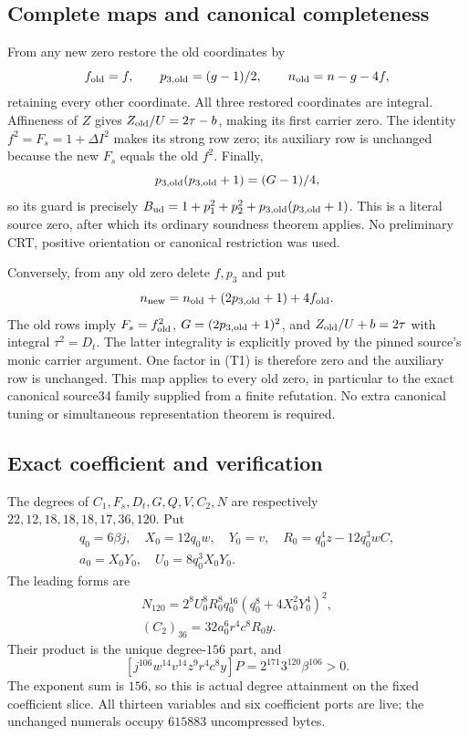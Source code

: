 \subsection{Complete maps and canonical completeness}
From any new zero restore the old coordinates by
\[
 f_{\rm old}=f,\qquad p_{3,\rm old}=(g-1)/2,\qquad
 n_{\rm old}=n-g-4f,
\]
retaining every other coordinate. All three restored coordinates are integral.
Affineness of $Z$ gives $Z_{\rm old}/U=2\tau-b$, making its first carrier zero.
The identity $f^2=F_s=1+\Delta I^2$ makes its strong row zero; its auxiliary row
is unchanged because the new $F_s$ equals the old $f^2$. Finally,
\[
 p_{3,\rm old}(p_{3,\rm old}+1)=(G-1)/4,
\]
so its guard is precisely
$B_{\rm ud}=1+p_1^2+p_2^2+p_{3,\rm old}(p_{3,\rm old}+1)$.
This is a literal source zero, after which its ordinary soundness theorem
applies. No preliminary CRT, positive orientation or canonical restriction was
used.

Conversely, from any old zero delete $f,p_3$ and put
\[
 n_{\rm new}=n_{\rm old}+(2p_{3,\rm old}+1)+4f_{\rm old}.
\]
The old rows imply $F_s=f_{\rm old}^2$, $G=(2p_{3,\rm old}+1)^2$, and
$Z_{\rm old}/U+b=2\tau$ with integral $\tau^2=D_t$. The latter integrality is
explicitly proved by the pinned source's monic carrier argument. One factor in
(T1) is therefore zero and the auxiliary row is unchanged. This map applies to
every old zero, in particular to the exact canonical source34 family supplied
from a finite refutation. No extra canonical tuning or simultaneous
representation theorem is required.

\subsection{Exact coefficient and verification}
The degrees of $C_1,F_s,D_t,G,Q,V,C_2,N$ are respectively
$22,12,18,18,18,17,36,120$. Put
\begin{gather*}
 q_0=6\beta j,\quad X_0=12q_0w,\quad Y_0=v,\quad
 R_0=q_0^4z-12q_0^3wC,\\
 a_0=X_0Y_0,\quad U_0=8q_0^3X_0Y_0.
\end{gather*}
The leading forms are
\begin{gather*}
 N_{120}=2^8U_0^8R_0^8q_0^{16}(q_0^8+4X_0^2Y_0^4)^2,\\
 (C_2)_{36}=32a_0^6r^4c^8R_0y.
\end{gather*}
Their product is the unique degree-$156$ part, and
\[
 [j^{106}w^{14}v^{14}z^9r^4c^8y]P
       =2^{171}3^{120}\beta^{106}>0.
\]
The exponent sum is $156$, so this is actual degree attainment on the fixed
coefficient slice. All thirteen variables and six coefficient ports are live;
the unchanged numerals occupy $615883$ uncompressed bytes.

